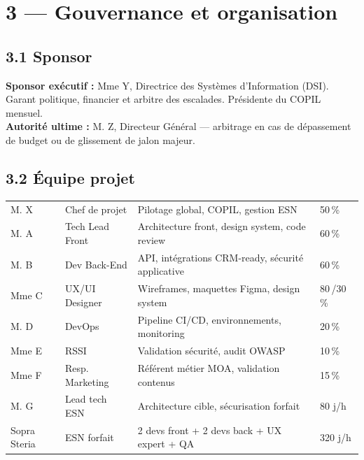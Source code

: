 \documentclass[11pt,a4paper,oneside]{report}
\begin{document}
\newpage
\section*{3 --- Gouvernance et organisation}

\subsection*{3.1 Sponsor}
\textbf{Sponsor exécutif :} Mme Y, Directrice des Systèmes d'Information (DSI). Garant politique, financier et arbitre des escalades. Présidente du COPIL mensuel. \\
\textbf{Autorité ultime :} M. Z, Directeur Général --- arbitrage en cas de dépassement de budget ou de glissement de jalon majeur.

\subsection*{3.2 Équipe projet}
\renewcommand{\arraystretch}{1.3}
\begin{tabularx}{\textwidth}{L{4cm} L{3cm} Y C{2cm}}
\toprule
{} &  &  &  \\
\midrule
M. X     & Chef de projet     & Pilotage global, COPIL, gestion ESN & 50\,\% \\
M. A    & Tech Lead Front    & Architecture front, design system, code review & 60\,\% \\
M. B      & Dev Back-End       & API, intégrations CRM-ready, sécurité applicative & 60\,\% \\
Mme C   & UX/UI Designer     & Wireframes, maquettes Figma, design system & 80\,/30\,\% \\
M. D     & DevOps             & Pipeline CI/CD, environnements, monitoring & 20\,\% \\
Mme E    & RSSI               & Validation sécurité, audit OWASP & 10\,\% \\
Mme F      & Resp. Marketing    & Référent métier MOA, validation contenus & 15\,\% \\
M. G    & Lead tech ESN      & Architecture cible, sécurisation forfait & 80 j/h \\
Sopra Steria  & ESN forfait        & 2 devs front + 2 devs back + UX expert + QA & 320 j/h \\
\bottomrule
\end{tabularx}
\end{document}
